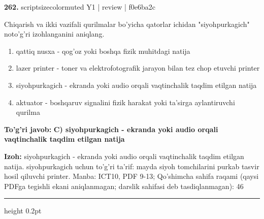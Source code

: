 \documentclass[10pt,a4paper]{article}
\begin{document}
{\bfseries\sffamily\color{ink} 262.} {scriptsizecolor{muted} Y1 | review | f0e6ba2c}
\par
Chiqarish va ikki vazifali qurilmalar bo'yicha qatorlar ichidan "siyohpurkagich" noto'g'ri izohlanganini aniqlang.
\begin{enumerate}[label=\Alph*),leftmargin=9mm]
\item qattiq nusxa - qog'oz yoki boshqa fizik muhitdagi natija
\item lazer printer - toner va elektrofotografik jarayon bilan tez chop etuvchi printer
\item siyohpurkagich - ekranda yoki audio orqali vaqtinchalik taqdim etilgan natija
\item aktuator - boshqaruv signalini fizik harakat yoki ta'sirga aylantiruvchi qurilma
\end{enumerate}
\begin{tcolorbox}[enhanced,breakable,colback=teal!4,colframe=teal!60!black,boxrule=0.45pt,arc=1.2mm,left=2.7mm,right=2.7mm,top=1.8mm,bottom=1.8mm,before skip=2mm,after skip=2mm]
{\bfseries\sffamily\color{teal}To'g'ri javob:} \textbf{C) siyohpurkagich - ekranda yoki audio orqali vaqtinchalik taqdim etilgan natija}
\par\smallskip
{\bfseries Izoh:} siyohpurkagich - ekranda yoki audio orqali vaqtinchalik taqdim etilgan natija. siyohpurkagich uchun to'g'ri ta'rif: mayda siyoh tomchilarini purkab tasvir hosil qiluvchi printer. Manba: ICT10, PDF 9-13; Qo'shimcha sahifa raqami (qaysi PDFga tegishli ekani aniqlanmagan; darslik sahifasi deb tasdiqlanmagan): 46
\end{tcolorbox}
\vspace{2mm}\hrule height 0.2pt\vspace{3mm}
\end{document}
